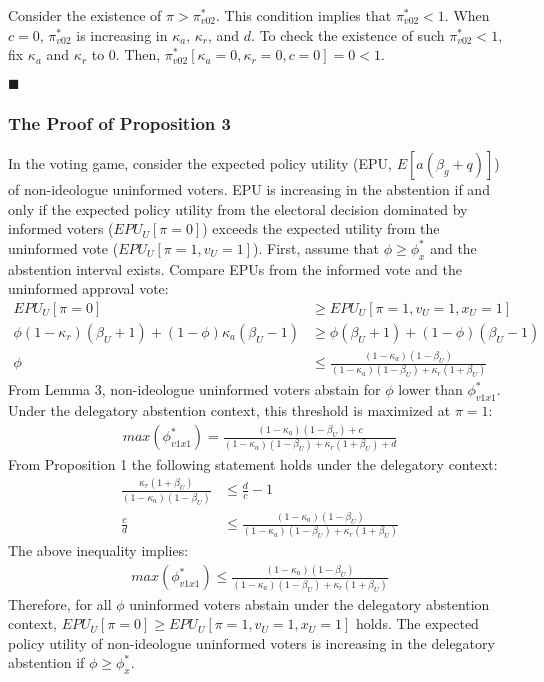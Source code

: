 \par Consider the existence of $\pi > \pi^*_{v02}$. This condition implies that $\pi^*_{v02} <1$. When $c=0$, $\pi^*_{v02}$ is increasing in $\kappa_a$, $\kappa_r$, and $d$. To check the existence of such $\pi^*_{v02} <1$, fix $\kappa_a$ and $\kappa_r$ to $0$. Then, $\pi^*_{v02}[\kappa_a=0,\kappa_r=0,c=0] = 0 < 1$.

\hfill $\blacksquare$ 

\subsubsection{The Proof of Proposition 3}

\par In the voting game, consider the expected policy utility (EPU, $E[a(\beta_g + q)]$) of non-ideologue uninformed voters. EPU is increasing in the abstention if and only if the expected policy utility from the electoral decision dominated by informed voters ($EPU_U[\pi=0]$) exceeds the expected utility from the uninformed vote ($EPU_U[\pi=1,v_U=1]$). First, assume that $\phi \geq \phi^*_x$ and the abstention interval exists. Compare EPUs from the informed vote and the uninformed approval vote:  
\begin{align*}
EPU_U[\pi=0] &\geq EPU_U[\pi=1,v_U=1,x_U=1] \\
\phi(1-\kappa_r)(\beta_U+1) + (1-\phi)\kappa_a(\beta_U-1) &\geq \phi(\beta_U+1) + (1-\phi)(\beta_U-1) \\
\phi &\leq \frac{(1-\kappa_a)(1-\beta_U)}{(1-\kappa_a)(1-\beta_U)+\kappa_r(1+\beta_U)}
\end{align*}
\noindent From Lemma 3, non-ideologue uninformed voters abstain for $\phi$ lower than $\phi^*_{v1x1}$. Under the delegatory abstention context, this threshold is maximized at $\pi=1$: 
\begin{align*}
max(\phi^*_{v1x1}) = \frac{(1-\kappa_a)(1-\beta_U) + c}{(1-\kappa_a)(1-\beta_U)+\kappa_r(1+\beta_U) + d}
\end{align*}
From Proposition 1 the following statement holds under the delegatory context:
\begin{align*}
\frac{\kappa_r(1+\beta_U)}{(1-\kappa_a)(1-\beta_U)} &\leq \frac{d}{c} - 1\\
\frac{c}{d} &\leq \frac{(1-\kappa_a)(1-\beta_U)}{(1-\kappa_a)(1-\beta_U)+\kappa_r(1+\beta_U)}
\end{align*}
The above inequality implies:  
\begin{align*}
max(\phi^*_{v1x1}) \leq \frac{(1-\kappa_a)(1-\beta_U)}{(1-\kappa_a)(1-\beta_U)+\kappa_r(1+\beta_U)}
\end{align*}
\noindent Therefore, for all $\phi$ uninformed voters abstain under the delegatory abstention context, $EPU_U[\pi=0] \geq EPU_U[\pi=1,v_U=1,x_U=1]$ holds. The expected policy utility of non-ideologue uninformed voters is increasing in the delegatory abstention if $\phi \geq \phi^*_x$. 

